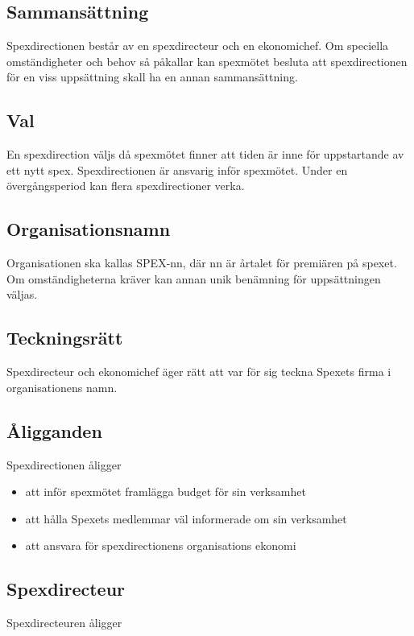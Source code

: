 \documentclass[a4paper]{article}
\begin{document}
\subsection{Sammansättning}
Spexdirectionen består av en spexdirecteur och en ekonomichef.\newline
\newline
Om speciella omständigheter och behov så påkallar kan spexmötet besluta att spexdirectionen för en viss uppsättning skall ha en annan sammansättning.

\subsection{Val}
En spexdirection väljs då spexmötet finner att tiden är inne för uppstartande av ett nytt spex. Spexdirectionen är ansvarig inför spexmötet. Under en övergångsperiod kan flera spexdirectioner verka.

\subsection{Organisationsnamn}
Organisationen ska kallas SPEX-nn, där nn är årtalet för premiären på spexet. Om omständigheterna kräver kan annan unik benämning för uppsättningen väljas.

\subsection{Teckningsrätt}
Spexdirecteur och ekonomichef äger rätt att var för sig teckna Spexets firma i organisationens namn.

\subsection{Åligganden}
Spexdirectionen åligger

\begin{itemize}
  \item att inför spexmötet framlägga budget för sin verksamhet
  \item att hålla Spexets medlemmar väl informerade om sin verksamhet
  \item att ansvara för spexdirectionens organisations ekonomi
\end{itemize}

\subsection{Spexdirecteur}
Spexdirecteuren åligger
\end{document}
